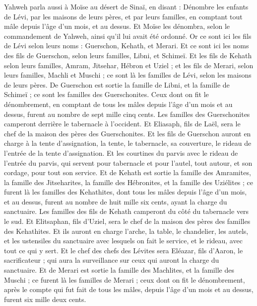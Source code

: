 \begin{multicols}{2}
Yahweh parla aussi à Moïse au désert de Sinaï, en disant :
Dénombre les enfants de Lévi, par les maisons de leurs pères, et par leurs familles, en comptant tout mâle depuis l'âge d'un mois, et au dessus.
Et Moïse les dénombra, selon le commandement de Yahweh, ainsi qu'il lui avait été ordonné.
Or ce sont ici les fils de Lévi selon leurs noms : Guerschon, Kehath, et Merari.
Et ce sont ici les noms des fils de Guerschon, selon leurs familles, Libni, et Schimeï.
Et les fils de Kehath selon leurs familles, Amram, Jitsehar, Hébron et Uziel ;
et les fils de Merari, selon leurs familles, Machli et Muschi ; ce sont là les familles de Lévi, selon les maisons de leurs pères.
De Guerschon est sortie la famille de Libni, et la famille de Schimeï ; ce sont les familles des Guerschonites.
Ceux dont on fit le dénombrement, en comptant de tous les mâles depuis l'âge d'un mois et au dessus, furent au nombre de sept mille cinq cents.
Les familles des Guerschonites camperont derrière le tabernacle à l'occident.
Et Eliasaph, fils de Laël, sera le chef de la maison des pères des Guerschonites.
Et les fils de Guerschon auront en charge à la tente d'assignation, la tente, le tabernacle, sa couverture, le rideau de l'entrée de la tente d'assignation.
Et les courtines du parvis avec le rideau de l'entrée du parvis, qui servent pour tabernacle et pour l'autel, tout autour, et son cordage, pour tout son service.
Et de Kehath est sortie la famille des Amramites, la famille des Jitseharites, la famille des Hébronites, et la famille des Uziélites ; ce furent là les familles des Kehathites,
dont tous les mâles depuis l'âge d'un mois, et au dessus, furent au nombre de huit mille six cents, ayant la charge du sanctuaire.
Les familles des fils de Kehath camperont du côté du tabernacle vers le sud.
Et Elitsaphan, fils d'Uziel, sera le chef de la maison des pères des familles des Kehathites.
Et ils auront en charge l'arche, la table, le chandelier, les autels, et les ustensiles du sanctuaire avec lesquels on fait le service, et le rideau, avec tout ce qui y sert.
Et le chef des chefs des Lévites sera Eléazar, fils d'Aaron, le sacrificateur ; qui aura la surveillance sur ceux qui auront la charge du sanctuaire.
Et de Merari est sortie la famille des Machlites, et la famille des Muschi ; ce furent là les familles de Merari ;
ceux dont on fit le dénombrement, après le compte qui fut fait de tous les mâles, depuis l'âge d'un mois et au dessus, furent six mille deux cents.

\end{multicols}

